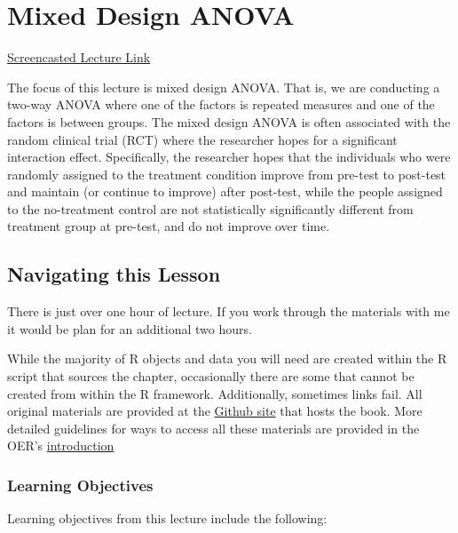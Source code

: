 \documentclass[
  11pt,
]{book}
\begin{document}
\hypertarget{Mixed}{%
\chapter{Mixed Design ANOVA}\label{Mixed}}

\href{https://spu.hosted.panopto.com/Panopto/Pages/Viewer.aspx?pid=b08debbb-948e-4f25-923a-ad8c01037e05}{Screencasted Lecture Link}

The focus of this lecture is mixed design ANOVA. That is, we are conducting a two-way ANOVA where one of the factors is repeated measures and one of the factors is between groups. The mixed design ANOVA is often associated with the random clinical trial (RCT) where the researcher hopes for a significant interaction effect. Specifically, the researcher hopes that the individuals who were randomly assigned to the treatment condition improve from pre-test to post-test and maintain (or continue to improve) after post-test, while the people assigned to the no-treatment control are not statistically significantly different from treatment group at pre-test, and do not improve over time.

\hypertarget{navigating-this-lesson-8}{%
\section{Navigating this Lesson}\label{navigating-this-lesson-8}}

There is just over one hour of lecture. If you work through the materials with me it would be plan for an additional two hours.

While the majority of R objects and data you will need are created within the R script that sources the chapter, occasionally there are some that cannot be created from within the R framework. Additionally, sometimes links fail. All original materials are provided at the \href{https://github.com/lhbikos/ReCenterPsychStats}{Github site} that hosts the book. More detailed guidelines for ways to access all these materials are provided in the OER's \protect\hyperlink{ReCintro}{introduction}

\hypertarget{learning-objectives-8}{%
\subsection{Learning Objectives}\label{learning-objectives-8}}

Learning objectives from this lecture include the following:
\end{document}
